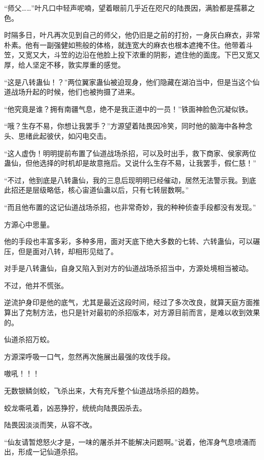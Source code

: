 
\begin{this_body}

“师父……”叶凡口中轻声呢喃，望着眼前几乎近在咫尺的陆畏因，满脸都是孺慕之色。

时隔多日，叶凡再次见到自己的师父，他仍旧是之前的打扮，一身灰白麻衣，非常朴素。他有一副强健如熊般的体格，就连宽大的麻衣也根本遮掩不住。他带着斗笠，又宽又大，斗笠的边沿在他脸上投下浓重的阴影，遮住他的面庞。下巴又宽又厚，给人坚定不移，敦实厚重的感觉。

“这是八转蛊仙！？”两位翼家蛊仙被迫现身，他们隐藏在湖泊当中，但是当这个仙道战场升起的时候，他们也被拘摄了进来。

“他究竟是谁？拥有南疆气息，绝不是我正道中的一员！”铁面神脸色沉凝似铁。

“哦？生存不易，你想让我罢手？”方源望着陆畏因冷笑，同时他的脑海中各种念头、思绪此起彼伏，如闪电交击。

“这人虚伪！明明提前布置了仙道战场杀招，可以及时出手，救下商家、侯家两位蛊仙，但他选择的时机却是故意拖后。又说什么生存不易，让我罢手，假仁慈！”

“不过，他到底是八转蛊仙，我的三息后现明明已经催动，居然无法警示我。到底此招还是层级略低，核心宙道仙蛊以后，只有七转层数啊。”

“而且他布置的这记仙道战场杀招，也非常奇妙，我的种种侦查手段都没有发现。”

方源心中思量。

他的手段也丰富多彩，多种多用，面对天底下绝大多数的七转、六转蛊仙，可以碾压，但是面对八转，却相形见绌了。

对手是八转蛊仙，自身又陷入到对方的仙道战场杀招当中，方源处境相当被动。

不过，他并不慌张。

逆流护身印是他的底气，尤其是最近这段时间，经过了多次改良，就算天庭方面推算出了克制方法，也只是针对最初的杀招版本，对方源目前而言，是难以收到效果的。

仙道杀招万蛟。

方源深呼吸一口气，忽然再次施展出最强的攻伐手段。

嗷吼！！！

无数银鳞剑蛟，飞杀出来，大有充斥整个仙道战场杀招的趋势。

蛟龙嘶吼着，凶恶狰狞，统统向陆畏因杀去。

陆畏因淡淡而笑，从容不改。

“仙友请暂熄怒火才是，一味的屠杀并不能解决问题啊。”说着，他浑身气息喷涌而出，形成一记仙道杀招。


\end{this_body}
